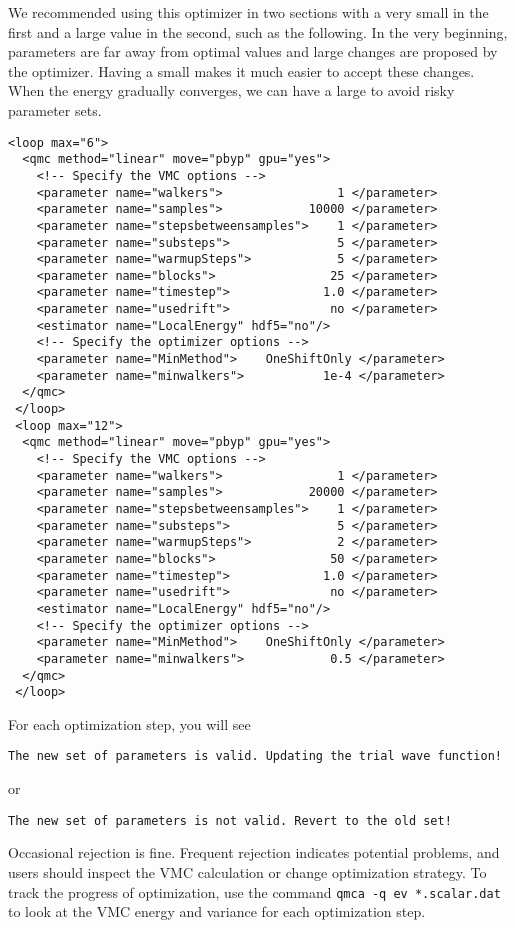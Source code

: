 We recommended using this optimizer in two sections with a very small  in the first and a large value in the second, such as the following.
In the very beginning, parameters are far away from optimal values and large changes are proposed by the optimizer.
Having a small  makes it much easier to accept these changes.
When the energy gradually converges, we can have a large  to avoid risky parameter sets.
\begin{lstlisting}[style=QMCPXML]
 <loop max="6">
  <qmc method="linear" move="pbyp" gpu="yes">
    <!-- Specify the VMC options -->
    <parameter name="walkers">                1 </parameter>
    <parameter name="samples">            10000 </parameter>
    <parameter name="stepsbetweensamples">    1 </parameter>
    <parameter name="substeps">               5 </parameter>
    <parameter name="warmupSteps">            5 </parameter>
    <parameter name="blocks">                25 </parameter>
    <parameter name="timestep">             1.0 </parameter>
    <parameter name="usedrift">              no </parameter>
    <estimator name="LocalEnergy" hdf5="no"/>
    <!-- Specify the optimizer options -->
    <parameter name="MinMethod">    OneShiftOnly </parameter>
    <parameter name="minwalkers">           1e-4 </parameter>
  </qmc>
 </loop>
 <loop max="12">
  <qmc method="linear" move="pbyp" gpu="yes">
    <!-- Specify the VMC options -->
    <parameter name="walkers">                1 </parameter>
    <parameter name="samples">            20000 </parameter>
    <parameter name="stepsbetweensamples">    1 </parameter>
    <parameter name="substeps">               5 </parameter>
    <parameter name="warmupSteps">            2 </parameter>
    <parameter name="blocks">                50 </parameter>
    <parameter name="timestep">             1.0 </parameter>
    <parameter name="usedrift">              no </parameter>
    <estimator name="LocalEnergy" hdf5="no"/>
    <!-- Specify the optimizer options -->
    <parameter name="MinMethod">    OneShiftOnly </parameter>
    <parameter name="minwalkers">            0.5 </parameter>
  </qmc>
 </loop>
\end{lstlisting}

For each optimization step, you will see\\
\begin{lstlisting}
The new set of parameters is valid. Updating the trial wave function!
\end{lstlisting}\par
or\par
\begin{lstlisting}
The new set of parameters is not valid. Revert to the old set!
\end{lstlisting}
Occasional rejection is fine. Frequent rejection indicates potential problems, and users should inspect the VMC calculation or change optimization strategy.
To track the progress of optimization, use the command \texttt{qmca -q ev *.scalar.dat} to look at the VMC energy and variance for each optimization step.

